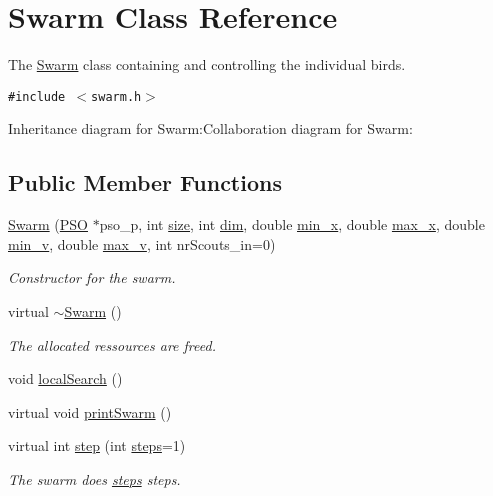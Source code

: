 \hypertarget{classSwarm}{
\section{Swarm Class Reference}
\label{classSwarm}
}
The \hyperlink{classSwarm}{Swarm} class containing and controlling the individual birds.  


{\tt \#include $<$swarm.h$>$}

Inheritance diagram for Swarm:Collaboration diagram for Swarm:\subsection*{Public Member Functions}
\begin{CompactItemize}
\item 
\hyperlink{classSwarm_9ab165396fc3ac7f37007c3942deb98f}{Swarm} (\hyperlink{classPSO}{PSO} $\ast$pso\_\-p, int \hyperlink{runpso_8cpp_439227feff9d7f55384e8780cfc2eb82}{size}, int \hyperlink{runpso_8cpp_70b5e28b5bc3d1b63a7435c5fe50b837}{dim}, double \hyperlink{classSwarm_b504e23c39413573e3685a88435f5f85}{min\_\-x}, double \hyperlink{classSwarm_e5075d21be96c1cdf441bc2b612177c1}{max\_\-x}, double \hyperlink{classSwarm_160c79397ea811636e17c0e4d6297729}{min\_\-v}, double \hyperlink{classSwarm_2b0dbde2c275f991580a07a745cb5ade}{max\_\-v}, int nrScouts\_\-in=0)
\begin{CompactList}\small\item\em Constructor for the swarm. \item\end{CompactList}\item 
virtual \hyperlink{classSwarm_5d74bf7e768edf0d8930ba187005a583}{$\sim$Swarm} ()
\begin{CompactList}\small\item\em The allocated ressources are freed. \item\end{CompactList}\item 
void \hyperlink{classSwarm_a76268fe09067ed70b04d8bd9d487a22}{localSearch} ()
\item 
virtual void \hyperlink{classSwarm_3e480dd422f3babe42d22d5af097c2ba}{printSwarm} ()
\item 
virtual int \hyperlink{classSwarm_7ab61f9797ce80e2edfb2bd881d7147c}{step} (int \hyperlink{runpso_8cpp_b4ae7205573977222eadd0795db193e2}{steps}=1)
\begin{CompactList}\small\item\em The swarm does \hyperlink{runpso_8cpp_b4ae7205573977222eadd0795db193e2}{steps} steps. \item\end{CompactList}\item 

\end{CompactItemize}
